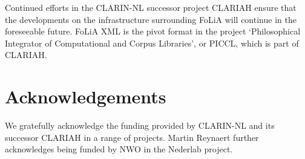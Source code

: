 \documentclass[a4paper,11pt]{article}
\begin{document}
Continued efforts in the CLARIN-NL successor project CLARIAH ensure that the
developments on the infrastructure surrounding FoLiA will continue in the
foreseeable future. FoLiA XML is the pivot format in the project
`Philosophical Integrator of Computational and Corpus Libraries', or PICCL,
\cite{Reynaert2015} which is part of CLARIAH.

\section*{Acknowledgements}

We gratefully acknowledge the funding provided by CLARIN-NL and its successor
CLARIAH in a range of projects. Martin Reynaert further acknowledges being
funded by NWO in the Nederlab project.


%

\end{document}
